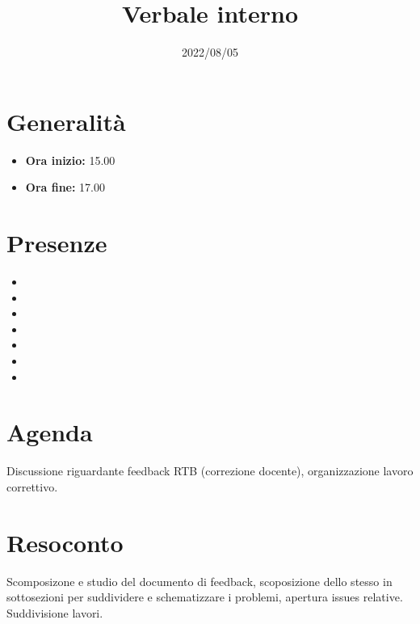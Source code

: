 \documentclass{classes/base}
\title{Verbale interno}
\date{2022/08/05}
\author{\marcob}
\renewcommand{\maketitle}{
    
}
\begin{document}
    \maketitle

    \section*{Generalità}
    \begin{itemize}
        \item \textbf{Ora inizio:} 15.00
        \item \textbf{Ora fine:} 17.00
    \end{itemize}

    \section*{Presenze}
    \begin{itemize}
    	\item \angela
        \item \marcob
        \item \matteo
        \item \marcov
        \item \giulio
        \item \ruth
        \item \tommaso
    \end{itemize}

    \section*{Agenda}
    Discussione riguardante feedback RTB (correzione docente), organizzazione lavoro correttivo.

    \section*{Resoconto}
    Scomposizone e studio del documento di feedback, scoposizione dello stesso in sottosezioni 
    per suddividere e schematizzare i problemi, apertura issues relative. 
    Suddivisione lavori.
\end{document}

